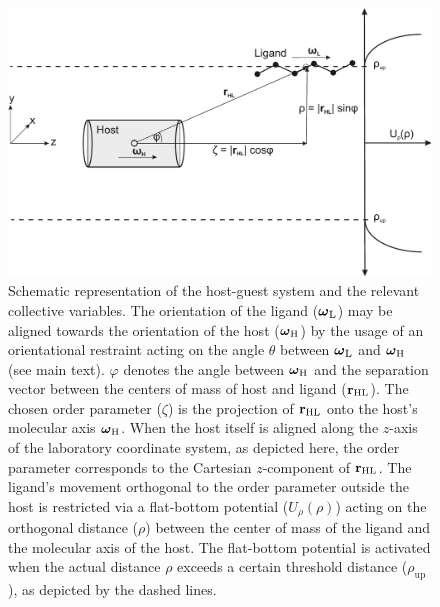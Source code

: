 \documentclass[9pt,lessons,pubversion]{livecoms}
\begin{document}
\begin{figure}[htb!]
\includegraphics[width=\linewidth]{figures/sketch_simulation_protocol.pdf}
\caption{Schematic representation of the host-guest system and the relevant collective variables. 
The orientation of the ligand ($\text{\boldmath$\omega$}_\mathrm{L}$) may be aligned towards the orientation of the host ($\text{\boldmath$\omega$}_\mathrm{H}$) by the usage of an orientational restraint 
acting on the angle $\theta$ between $\text{\boldmath$\omega$}_\mathrm{L}$ and $\text{\boldmath$\omega$}_\mathrm{H}$ (see main text).
$\varphi$ denotes the angle between $\text{\boldmath$\omega$}_\mathrm{H}$ and the separation vector between the centers of mass of host and ligand ($\bf{r}_\mathrm{HL}$). 
The chosen order parameter ($\zeta$) is the projection of $\bf{r}_\mathrm{HL}$ onto the host's molecular axis $\text{\boldmath$\omega$}_\mathrm{H}$.
When the host itself is aligned along the $z$-axis of the laboratory coordinate system, as depicted here, the order parameter corresponds to the Cartesian $z$-component of $\bf{r}_\mathrm{HL}$. 
The ligand's movement orthogonal to the order parameter outside the host is restricted via a  flat-bottom potential ($U_\rho(\rho)$) acting on the orthogonal distance ($\rho$) 
between the center of mass of the ligand and the molecular axis of the host. 
The flat-bottom potential is activated when the actual distance $\rho$ exceeds a certain threshold distance ($\rho_\mathrm{up}$), as depicted by the dashed lines.}
\label{fig:host_guest_sketch}
\end{figure}
\end{document}
